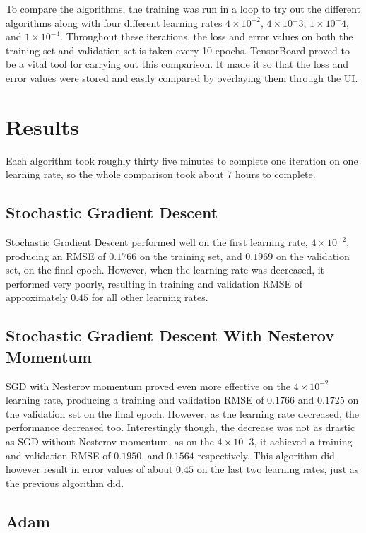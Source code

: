 \documentclass[12pt,a4paper,oneside,oldfontcommands]{memoir}
\begin{document}
To compare the algorithms, the training was run in a loop to try out the different algorithms along with four different learning rates \(4\times10^{-2}\), \(4\times10{^-3}\), \(1\times{10^-4}\), and \(1\times10^{-4}\). Throughout these iterations, the loss and error values on both the training set and validation set is taken every 10 epochs. TensorBoard proved to be a vital tool for carrying out this comparison. It made it so that the loss and error values were stored and easily compared by overlaying them through the UI.

\section{Results}

Each algorithm took roughly thirty five minutes to complete one iteration on one learning rate, so the whole comparison took about 7 hours to complete.

\subsection{Stochastic Gradient Descent}

Stochastic Gradient Descent performed well on the first learning rate, \(4\times10^{-2}\), producing an RMSE of \(0.1766\) on the training set, and \(0.1969\) on the validation set, on the final epoch. However, when the learning rate was decreased, it performed very poorly, resulting in training and validation RMSE of approximately \(0.45\) for all other learning rates.

\subsection{Stochastic Gradient Descent With Nesterov Momentum}

SGD with Nesterov momentum proved even more effective on the \(4\times10^{-2}\) learning rate, producing a training and validation RMSE of \(0.1766\) and \(0.1725\) on the validation set on the final epoch. However, as the learning rate decreased, the performance decreased too. Interestingly though, the decrease was not as drastic as SGD without Nesterov momentum, as on the \(4\times10{^-3}\), it achieved a training and validation RMSE of \(0.1950\), and \(0.1564\) respectively. This algorithm did however result in error values of about \(0.45\) on the last two learning rates, just as the previous algorithm did.

\subsection{Adam} \label{Adam}
\end{document}
